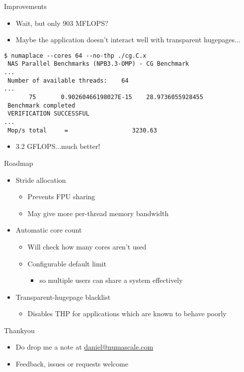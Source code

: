 \documentclass{beamer}
\begin{document}
\begin{frame}[fragile]{Improvements}
\begin{itemize}
\item Wait, but only 903 MFLOPS?
\item Maybe the application doesn't interact well with transparent hugepages...
\end{itemize}

\begin{verbatim}
$ numaplace --cores 64 --no-thp ./cg.C.x
 NAS Parallel Benchmarks (NPB3.3-OMP) - CG Benchmark
...
 Number of available threads:    64
...
       75       0.90260466198027E-15    28.9736055928455
 Benchmark completed
 VERIFICATION SUCCESSFUL
...
 Mop/s total     =                  3230.63
\end{verbatim}

\begin{itemize}
\item 3.2 GFLOPS...much better!
\end{itemize}
\end{frame}

\begin{frame}[fragile]{Roadmap}
\begin{itemize}
\item Stride allocation
	\begin{itemize}
	\item Prevents FPU sharing
	\item May give more per-thread memory bandwidth
	\end{itemize}

\vspace{4pt}

\item Automatic core count
	\begin{itemize}
	\item Will check how many cores aren't used
	\item Configurable default limit
		\begin{itemize}
		\item so multiple users can share a system effectively
		\end{itemize}
	\end{itemize}

\item Transparent-hugepage blacklist
	\begin{itemize}
	\item Disables THP for applications which are known to behave poorly
	\end{itemize}

\end{itemize}
\end{frame}

\begin{frame}[fragile]{Thankyou}
\begin{itemize}
\item Do drop me a note at \href{mailto:daniel@numascale.com}{daniel@numascale.com}
\vspace{8pt}
\item Feedback, issues or requests welcome
\end{itemize}
\end{frame}
\end{document}
